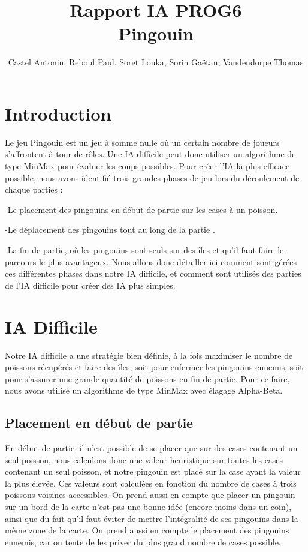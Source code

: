 \documentclass{report}
\title{\textbf{Rapport IA PROG6}\\Pingouin}
\author{Castel Antonin, Reboul Paul, Soret Louka, Sorin Gaëtan, Vandendorpe Thomas}
\begin{document}
\maketitle{}
\tableofcontents
\chapter{Introduction}
Le jeu Pingouin est un jeu à somme nulle où un certain nombre de joueurs s'affrontent à tour de rôles. Une IA difficile peut donc utiliser un algorithme de type MinMax pour évaluer les coups possibles. Pour créer l'IA la plus efficace possible, nous avons identifié trois grandes phases de jeu lors du déroulement de chaque parties :

-Le placement des pingouins en début de partie sur les cases à un poisson.

-Le déplacement des pingouins tout au long de la partie .

-La fin de partie, où les pingouins sont seuls sur des îles et qu'il faut faire le parcours le plus avantageux.
Nous allons donc détailler ici comment sont gérées ces différentes phases dans notre IA difficile, et comment sont utilisés des parties de l'IA difficile pour créer des IA plus simples.
\chapter{IA Difficile}
Notre IA difficile a une stratégie bien définie, à la fois maximiser le nombre de poissons récupérés et faire des îles, soit pour enfermer les pingouins ennemis, soit pour s'assurer une grande quantité de poissons en fin de partie.
Pour ce faire, nous avons utilisé un algorithme de type MinMax avec élagage Alpha-Beta.
\section{Placement en début de partie}
En début de partie, il n'est possible de se placer que sur des cases contenant un seul poisson, nous calculons donc une valeur heuristique sur toutes les cases contenant un seul poisson, et notre pingouin est placé sur la case ayant la valeur la plus élevée.
Ces valeurs sont calculées en fonction du nombre de cases à trois poissons voisines accessibles. 
\newline
On prend aussi en compte que placer un pingouin sur un bord de la carte n'est pas une bonne idée (encore moins dans un coin), ainsi que du fait qu'il faut éviter de mettre l'intégralité de ses pingouins dans la même zone de la carte.
\newline
On prend aussi en compte le placement des pingouins ennemis, car on tente de les priver du plus grand nombre de cases possible.
\end{document}
